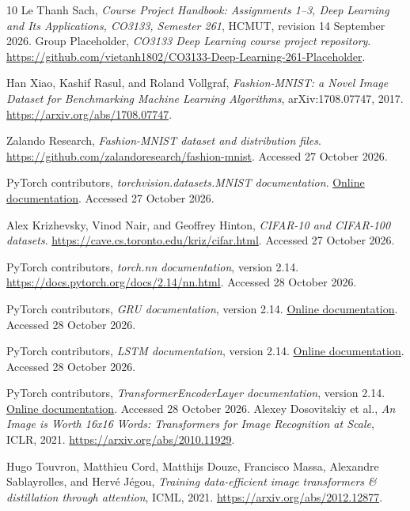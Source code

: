 {}
\begin{thebibliography}{10}
Le Thanh Sach, \emph{Course Project Handbook: Assignments 1--3, Deep Learning
and Its Applications, CO3133, Semester 261}, HCMUT, revision 14 September 2026.
Group Placeholder, \emph{CO3133 Deep Learning course project repository}.
\url{https://github.com/vietanh1802/CO3133-Deep-Learning-261-Placeholder}.

Han Xiao, Kashif Rasul, and Roland Vollgraf,
\emph{Fashion-MNIST: a Novel Image Dataset for Benchmarking Machine Learning
Algorithms}, arXiv:1708.07747, 2017.
\url{https://arxiv.org/abs/1708.07747}.

Zalando Research, \emph{Fashion-MNIST dataset and distribution files}.
\url{https://github.com/zalandoresearch/fashion-mnist}.
Accessed 27 October 2026.

PyTorch contributors, \emph{torchvision.datasets.MNIST documentation}.
\href{https://docs.pytorch.org/vision/stable/generated/torchvision.datasets.MNIST.html}{Online documentation}.
Accessed 27 October 2026.

Alex Krizhevsky, Vinod Nair, and Geoffrey Hinton,
\emph{CIFAR-10 and CIFAR-100 datasets}.
\url{https://cave.cs.toronto.edu/kriz/cifar.html}.
Accessed 27 October 2026.

PyTorch contributors, \emph{torch.nn documentation}, version 2.14.
\url{https://docs.pytorch.org/docs/2.14/nn.html}.
Accessed 28 October 2026.

PyTorch contributors, \emph{GRU documentation}, version 2.14.
\href{https://docs.pytorch.org/docs/2.14/generated/torch.nn.GRU.html}{Online documentation}.
Accessed 28 October 2026.

PyTorch contributors, \emph{LSTM documentation}, version 2.14.
\href{https://docs.pytorch.org/docs/2.14/generated/torch.nn.LSTM.html}{Online documentation}.
Accessed 28 October 2026.

PyTorch contributors, \emph{TransformerEncoderLayer documentation}, version 2.14.
\href{https://docs.pytorch.org/docs/2.14/generated/torch.nn.TransformerEncoderLayer.html}{Online documentation}.
Accessed 28 October 2026.
Alexey Dosovitskiy et al., \emph{An Image is Worth 16x16 Words: Transformers
for Image Recognition at Scale}, ICLR, 2021.
\url{https://arxiv.org/abs/2010.11929}.

Hugo Touvron, Matthieu Cord, Matthijs Douze, Francisco Massa, Alexandre
Sablayrolles, and Herv\'e J\'egou, \emph{Training data-efficient image transformers
\& distillation through attention}, ICML, 2021.
\url{https://arxiv.org/abs/2012.12877}.
\end{thebibliography}
